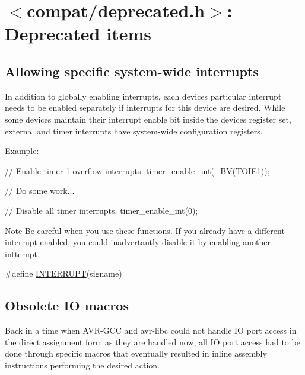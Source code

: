\hypertarget{group__deprecated__items}{}\section{$<$compat/deprecated.h$>$\+: Deprecated items}
\label{group__deprecated__items}
\subsection*{Allowing specific system-\/wide interrupts}
\label{_amgrp193128e5bbdec1bc980f5611231d3b55}%
In addition to globally enabling interrupts, each device\textquotesingle{}s particular interrupt needs to be enabled separately if interrupts for this device are desired. While some devices maintain their interrupt enable bit inside the device\textquotesingle{}s register set, external and timer interrupts have system-\/wide configuration registers.

Example\+:


\begin{DoxyCode}
\textcolor{comment}{// Enable timer 1 overflow interrupts.}
timer\_enable\_int(\_BV(TOIE1));

\textcolor{comment}{// Do some work...}

\textcolor{comment}{// Disable all timer interrupts.}
timer\_enable\_int(0);
\end{DoxyCode}


\begin{DoxyNote}{Note}
Be careful when you use these functions. If you already have a different interrupt enabled, you could inadvertantly disable it by enabling another intterupt. 
\end{DoxyNote}
\begin{DoxyCompactItemize}
\item 
\#define \hyperlink{group__deprecated__items_gaa0b2d3a87492967c01615f32f30d06d5}{I\+N\+T\+E\+R\+R\+U\+PT}(signame)
\end{DoxyCompactItemize}
\subsection*{Obsolete IO macros}
\label{_amgrpaf1202294281a87ab5300af3ed2225e0}%
Back in a time when A\+V\+R-\/\+G\+CC and avr-\/libc could not handle IO port access in the direct assignment form as they are handled now, all IO port access had to be done through specific macros that eventually resulted in inline assembly instructions performing the desired action.

